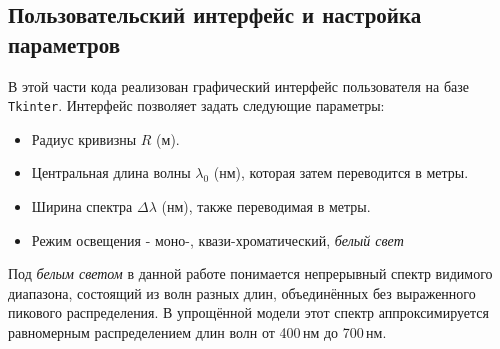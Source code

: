 \documentclass[a4paper,11pt]{article}
\theoremstyle{definition}
\begin{document}
    \subsection{Пользовательский интерфейс и настройка параметров}
    В этой части кода реализован графический интерфейс пользователя на базе \texttt{Tkinter}.
    Интерфейс позволяет задать следующие параметры:
    \begin{itemize}
        \item Радиус кривизны \( R \) (м).
        \item Центральная длина волны \( \lambda_0 \) (нм), которая затем переводится в метры.
        \item Ширина спектра \(\Delta \lambda\) (нм), также переводимая в метры.
        \item Режим освещения - моно-, квази-хроматический, \textit{белый свет}
    \end{itemize}
    Под \emph{белым светом} в данной работе понимается непрерывный спектр видимого диапазона,
    состоящий из волн разных длин, объединённых без выраженного пикового распределения.
    В упрощённой модели этот спектр аппроксимируется равномерным распределением длин волн
    от 400\,нм до 700\,нм.
\end{document}
